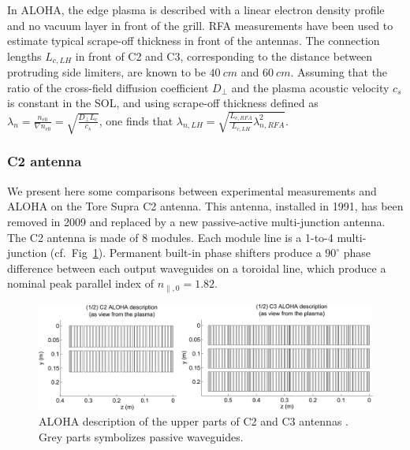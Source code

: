 In ALOHA, the edge plasma is described with a linear electron density profile and no vacuum layer in front of the grill. RFA measurements have been used to estimate typical scrape-off thickness in front of the antennas\cite{kocan2008-1}. The connection lengths $L_{c,LH}$ in front of C2 and C3, corresponding to the distance between protruding side limiters, are known to be $40~\si{cm}$ and $60~\si{cm}$. Assuming that the ratio of the cross-field diffusion coefficient $D_\perp$ and the plasma acoustic velocity $c_s$ is constant in the SOL, and using scrape-off thickness defined as $\lambda_n=\frac{n_{e0}}{\nabla n_{e0}}=\sqrt{\frac{D_\perp L_c}{c_s}}$, one finds that $\lambda_{n,LH}=\sqrt{\frac{L_{c,RFA}}{L_{c,LH}}\lambda_{n,RFA}^2}$. 



\subsubsection{C2 antenna}
We present here some comparisons between experimental measurements and ALOHA on the Tore Supra C2 antenna. This antenna, installed in 1991, has been removed in 2009 and replaced by a new passive-active multi-junction antenna\cite{guilhem2009,guilhem2011}. The C2 antenna is made of 8 modules. Each module line is a 1-to-4 multi-junction (cf.~Fig~\ref{fig:geometry_TS_LHAntennas}). Permanent built-in phase shifters produce a $90^\circ$ phase difference between each output waveguides on a toroidal line, which produce a nominal peak parallel index of $n_{\parallel,0}=1.82$.

\begin{figure}[h]
	\centering
	\includegraphics[width=1.0\textwidth]{figures/chap2/Tore_Supra/geometry_TS_LHAntennas}
	\caption{ALOHA description of the upper parts of C2 and C3 antennas . Grey parts symbolizes passive waveguides.}
	\label{fig:geometry_TS_LHAntennas}
\end{figure}

